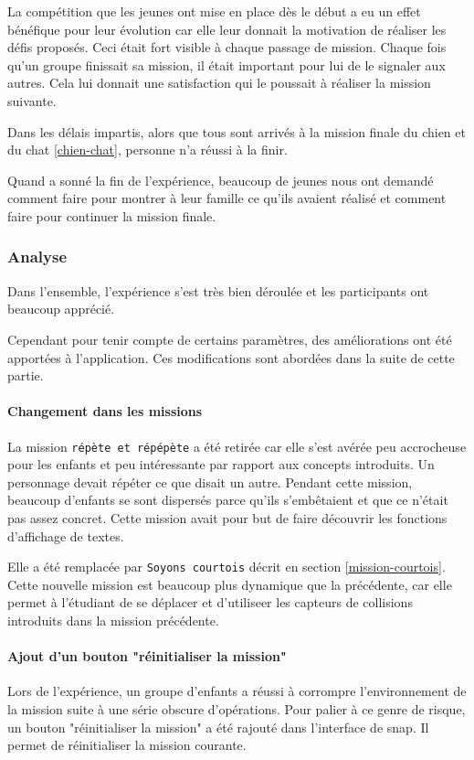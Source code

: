 La compétition que les jeunes ont mise en place dès le début a eu un effet bénéfique pour leur évolution car elle leur donnait la motivation de réaliser les défis proposés. Ceci était fort visible à chaque passage de \gls{mission}. Chaque fois qu'un groupe finissait sa \gls{mission}, il était important pour lui de le signaler aux autres. Cela lui donnait une satisfaction qui le poussait à réaliser la \gls{mission} suivante.

Dans les délais impartis, alors que tous sont arrivés à la \gls{mission} finale du chien et du chat \ref{chien-chat}, personne n'a réussi à la finir.

Quand a sonné la fin de l'expérience, beaucoup de jeunes nous ont demandé comment faire pour montrer à leur famille ce qu'ils avaient réalisé et comment faire pour continuer la \gls{mission} finale.

\subsubsection{Analyse}
\label{analyse-kidscode}
Dans l'ensemble, l'expérience s'est très bien déroulée et les participants ont beaucoup apprécié.

Cependant pour tenir compte de certains paramètres, des améliorations ont été apportées à l'application. Ces modifications sont abordées dans la suite de cette partie.

\paragraph{Changement dans les missions}
La \gls{mission} \texttt{répète et répépète} a été retirée car elle s'est avérée peu accrocheuse pour les enfants et peu intéressante par rapport aux concepts introduits. Un personnage devait répéter ce que disait un autre. Pendant cette \gls{mission}, beaucoup d'enfants se sont dispersés parce qu'ils s'embêtaient et que ce n'était pas assez concret. Cette \gls{mission} avait pour but de faire découvrir les fonctions d'affichage de textes.

Elle a été remplacée par \texttt{Soyons courtois} décrit en section \ref{mission-courtois}. Cette nouvelle \gls{mission} est beaucoup plus dynamique que la précédente, car elle permet à l'étudiant de se déplacer et d'utiliseer les capteurs de collisions introduits dans la \gls{mission} précédente.

\paragraph{Ajout d'un bouton "réinitialiser la mission"}
Lors de l'expérience, un groupe d'enfants a réussi à corrompre l'environnement de la \gls{mission} suite à une série obscure d'opérations. Pour palier à ce genre de risque, un bouton "réinitialiser la mission" a été rajouté dans l'interface de \gls{snap}. Il permet de réinitialiser la \gls{mission} courante.

